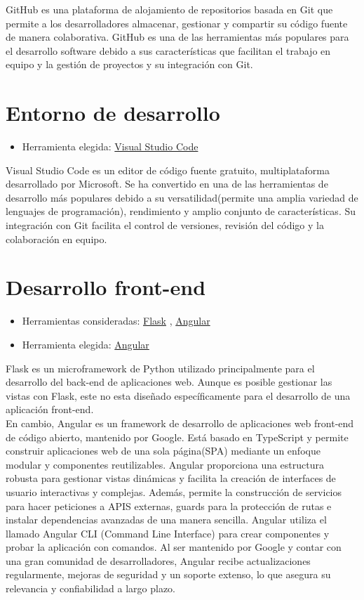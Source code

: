 GitHub es una plataforma de alojamiento de repositorios basada en Git que permite a los desarrolladores almacenar, gestionar y compartir su código fuente de manera colaborativa. GitHub es una de las herramientas más populares para el desarrollo software debido a sus características que facilitan el trabajo en equipo y la gestión de proyectos y su integración con Git.

\section{Entorno de desarrollo}
\begin{itemize}
    \item Herramienta elegida: \href{https://code.visualstudio.com/}{Visual Studio Code} 
\end{itemize}

Visual Studio Code es un editor de código fuente gratuito, multiplataforma desarrollado por Microsoft. Se ha convertido en una de las herramientas de desarrollo más populares debido a su versatilidad(permite una amplia variedad de lenguajes de programación), rendimiento y amplio conjunto de características. Su integración con Git facilita el control de versiones, revisión del código y la colaboración en equipo.

\section{Desarrollo front-end}
\begin{itemize}
    \item Herramientas consideradas:  \href{https://flask.palletsprojects.com/en/3.0.x/}{Flask} , \href{https://angular.io/}{Angular}
    \item Herramienta elegida: \href{https://angular.io/}{Angular}
\end{itemize}
Flask es un microframework de Python utilizado principalmente para el desarrollo del back-end de aplicaciones web. Aunque es posible gestionar las vistas con Flask, este no esta diseñado específicamente para el desarrollo de una aplicación front-end. \\

En cambio, Angular es un framework de desarrollo de aplicaciones web front-end de código abierto, mantenido por Google. Está basado en TypeScript y permite construir aplicaciones web de una sola página(SPA) mediante un enfoque modular y componentes reutilizables. Angular proporciona una estructura robusta para gestionar vistas dinámicas y facilita la creación de interfaces de usuario interactivas y complejas. Además, permite la construcción de servicios para hacer peticiones a APIS externas, guards para la protección de rutas e instalar dependencias avanzadas de una manera sencilla. Angular utiliza el llamado Angular CLI (Command Line Interface) para crear componentes y probar la aplicación con comandos. Al ser mantenido por Google y contar con una gran comunidad de desarrolladores, Angular recibe actualizaciones regularmente, mejoras de seguridad y un soporte extenso, lo que asegura su relevancia y confiabilidad a largo plazo. \\ 

